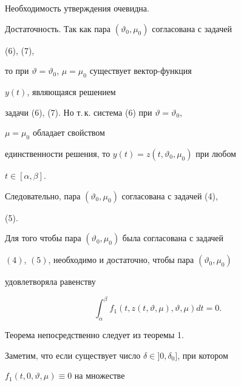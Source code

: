 \begin{pf} 


Необходимость утверждения очевидна. 


\smallskip 


 


Достаточность. Так как пара $(\vartheta_0,\mu_0)$ согласована с задачей 


(6), (7), 


то при $\vartheta=\vartheta_0$, $\mu=\mu_0$ существует вектор-функция 


$y(t)$, являющаяся решением 


задачи (6), (7). Но т.\,к. система (6) при $\vartheta=\vartheta_0$, 


$\mu=\mu_0$ обладает свойством 


единственности решения, то $y(t)=z(t,\vartheta_0,\mu_0)$ при любом 


$t\in[\alpha,\beta]$. 


Следовательно, пара $(\vartheta_0,\mu_0)$ согласована с задачей (4), 


(5). 


\end{pf} 


 


\begin{thm} 


Для того чтобы пара $(\vartheta_0,\mu_0)$ была согласована с задачей 


$(4)$, $(5)$, необходимо и достаточно, чтобы пара $(\vartheta_0,\mu_0)$ 


удовлетворяла равенству 


\begin{equation} 


\int^\beta_\alpha f_1(t,z(t,\vartheta,\mu),\vartheta,\mu)dt=0. 


\end{equation} 


\end{thm} 


 


Теорема непосредственно следует из теоремы 1. 


 


Заметим, что если существует число $\delta\in]0,\delta_0]$, при котором 


$f_1(t,0,\vartheta,\mu)\equiv0$ на множестве 


